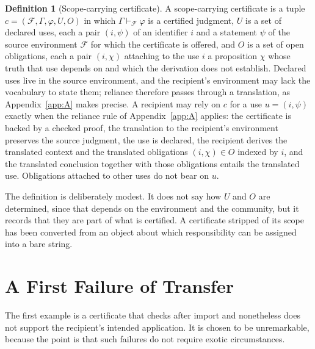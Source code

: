 \documentclass[11pt]{book}
\theoremstyle{definition}
\newtheorem{definition}[theorem]{Definition}
\theoremstyle{remark}
\newcommand{\Fenv}{\mathcal{F}}
\begin{document}
\begin{definition}[Scope-carrying certificate]\label{def:scc}
A scope-carrying certificate is a tuple $c=(\Fenv,\Gamma,\varphi,U,O)$ in which $\Gamma\vdash_{\Fenv}\varphi$ is a certified judgment, $U$ is a set of declared uses, each a pair $(i,\psi)$ of an identifier $i$ and a statement $\psi$ of the source environment $\Fenv$ for which the certificate is offered, and $O$ is a set of open obligations, each a pair $(i,\chi)$ attaching to the use $i$ a proposition $\chi$ whose truth that use depends on and which the derivation does not establish. Declared uses live in the source environment, and the recipient's environment may lack the vocabulary to state them; reliance therefore passes through a translation, as Appendix~\ref{app:A} makes precise. A recipient may rely on $c$ for a use $u=(i,\psi)$ exactly when the reliance rule of Appendix~\ref{app:A} applies: the certificate is backed by a checked proof, the translation to the recipient's environment preserves the source judgment, the use is declared, the recipient derives the translated context and the translated obligations $(i,\chi)\in O$ indexed by $i$, and the translated conclusion together with those obligations entails the translated use. Obligations attached to other uses do not bear on $u$.
\end{definition}

The definition is deliberately modest. It does not say how $U$ and $O$ are determined, since that depends on the environment and the community, but it records that they are part of what is certified. A certificate stripped of its scope has been converted from an object about which responsibility can be assigned into a bare string.

\section{A First Failure of Transfer}

The first example is a certificate that checks after import and nonetheless does not support the recipient's intended application. It is chosen to be unremarkable, because the point is that such failures do not require exotic circumstances.
\end{document}
